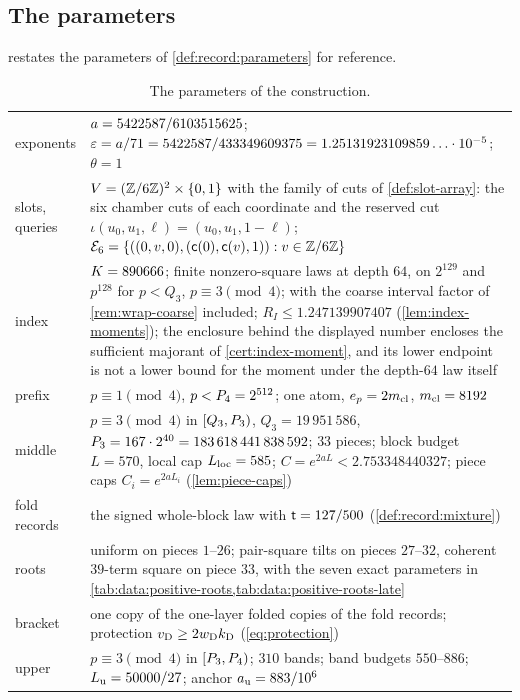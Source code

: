 \subsection{The parameters}\label{subsec:data:parameters}

 restates the parameters of
\cref{def:record:parameters} for reference.

{\scriptsize\setlength{\tabcolsep}{4pt}
\begin{longtable}{@{}p{}p{}@{}}
\caption{The parameters of the construction.}\label{tab:data:parameters}\\
\toprule
exponents & $a=5422587/6103515625$; $\varepsilon=a/71=5422587/433349609375=1.25131923109859\ldots\cdot10^{-5}$; $\theta=1$\\
slots, queries & $V=(\mathbb Z/6\mathbb Z)^2\times\{0,1\}$ with the family of cuts of \cref{def:slot-array}: the six chamber cuts of each coordinate and the reserved cut $\iota(u_0,u_1,\ell)=(u_0,u_1,1-\ell)$; $\mathcal E_6=\{((0,v,0),(\mathsf c(0),\mathsf c(v),1)):v\in\mathbb Z/6\mathbb Z\}$\\
index & $K=890666$; finite nonzero-square laws at depth $64$, on $2^{129}$ and $p^{128}$ for $p<Q_3$, $p\equiv3\pmod4$; with the coarse interval factor of \cref{rem:wrap-coarse} included; $R_I\le 1.247139907407$ (\cref{lem:index-moments}); the enclosure behind the displayed number encloses the sufficient majorant of \cref{cert:index-moment}, and its lower endpoint is not a lower bound for the moment under the depth-$64$ law itself\\
prefix & $p\equiv1\pmod4$, $p<P_4=2^{512}$; one atom, $e_p=2m_{\mathrm{cl}}$, $m_{\mathrm{cl}}=8192$\\
middle & $p\equiv3\pmod4$ in $[Q_3,P_3)$, $Q_3=19\,951\,586$, $P_3=167\cdot2^{40}=183\,618\,441\,838\,592$; $33$ pieces; block budget $L=570$, local cap $L_{\rm loc}=585$; $C=e^{2aL}<2.753348440327$; piece caps $C_i=e^{2aL_i}$ (\cref{lem:piece-caps})\\
fold records & the signed whole-block law with $\mathsf t=127/500$ (\cref{def:record:mixture})\\
roots & uniform on pieces $1$--$26$; pair-square tilts on pieces $27$--$32$, coherent $39$-term square on piece $33$, with the seven exact parameters in \cref{tab:data:positive-roots,tab:data:positive-roots-late}\\
bracket & one copy of the one-layer folded copies of the fold records; protection $v_{\rm D}\ge2w_{\rm D}k_{\rm D}$ (\eqref{eq:protection})\\
upper & $p\equiv3\pmod4$ in $[P_3,P_4)$; $310$ bands; band budgets $550$--$886$; $L_{\rm u}=50000/27$; anchor $a_{\rm u}=883/10^6$\\

\end{longtable}}
